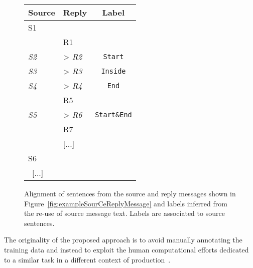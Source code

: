 \begin{figure}
\begin{minipage}{.63\textwidth}
        \caption{A source message and its reply (\textit{ubuntu-users} email archive). Sentences have been tagged to facilitate the discussion. %
        }\label{fig:exampleSourCeReplyMessage}
\end{minipage}
\hfill
\begin{minipage}{.3\textwidth}
\small\centering
\begin{tabular}{*{2}{|l}|c|}
\toprule
\textbf{Source} & \textbf{Reply} & \textbf{Label}\\
	\midrule
S1  & & \\
    & R1 & \\
\textit{S2}  & > \textit{R2}& \texttt{Start}\\
\textit{S3}  & > \textit{R3}& \texttt{Inside}\\
\textit{S4}  & > \textit{R4}& \texttt{End}\\
    & R5 & \\
\textit{S5}  & > \textit{R6} & \texttt{Start\&End}\\
    & R7 & \\
    & [...] & \\
S6    &  & \\ \ 
[...] \    &  & \\
	\bottomrule
\end{tabular}
\caption{Alignment of sentences from the source and reply messages shown in Figure~\ref{fig:exampleSourCeReplyMessage} and labels inferred from the re-use of source message text. Labels are associated to source sentences.}
\label{fig:exampleSegmentationLabels}
\end{minipage}
\end{figure}
%
The originality of the proposed approach is to avoid manually annotating the training data and instead to exploit the human computational efforts dedicated to a similar task in a different context of production~\cite{ahn:2006:computer}. 
